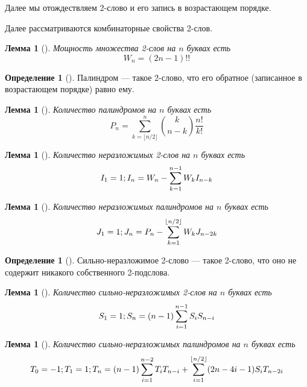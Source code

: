 \documentclass[a4paper,fleqn,12pt,top=0pt]{article}
\theoremstyle{plain}
\newtheorem{lemma}[theorem]{Лемма}
\theoremstyle{definition}
\newtheorem{definition}[theorem]{Определение}
\theoremstyle{remark}
\begin{document}
Далее мы отождествляем 2-слово и его запись в возрастающем порядке.

Далее рассматриваются комбинаторные свойства 2-слов.

\begin{lemma}[]
    Мощность множества 2-слов на $n$ буквах есть 
    \[
    W_n = (2n - 1)!!
    \]
\end{lemma}

\begin{definition}[]
    Палиндром --- такое 2-слово, что его обратное (записанное в возрастающем порядке) равно ему.
\end{definition}

\begin{lemma}[]
    Количество палиндромов на $n$ буквах есть
    \[
    P_n = \sum_{k=\lfloor n/2 \rfloor}^{n} \binom{k}{n - k} \frac{n!}{k!}
    \]
\end{lemma}

\begin{lemma}[]
    Количество неразложимых 2-слов на $n$ буквах есть 
    \[
    I_1 = 1; \\
    I_n = W_n - \sum_{k = 1}^{n - 1}W_kI_{n - k}
    \]
\end{lemma}

\begin{lemma}[]
    Количество неразложимых палиндромов на $n$ буквах есть
    \[
    J_1 = 1; \\ J_n = P_n - \sum_{k = 1}^{\lfloor n / 2 \rfloor}W_kJ_{n - 2k}
    \]
\end{lemma}

\begin{definition}[]
    Сильно-неразложимое 2-слово --- такое 2-слово, что оно не содержит никакого собственного 2-подслова.
\end{definition}

\begin{lemma}[]
    Количество сильно-неразложимых 2-слов на $n$ буквах есть 
    \[
    S_1 = 1; \\
    S_n = (n - 1) \sum_{i = 1}^{n - 1}S_i S_{n - i}
    \]
\end{lemma}

\begin{lemma}[]
    Количество сильно-неразложимых палиндромов на $n$ буквах есть 
    \[
    T_0 = -1; \\
    T_1 = 1; \\
    T_n = (n - 1) \sum_{i = 1}^{n - 2}T_i T_{n - i} + \sum_{i = 1}^{\lfloor n / 2 \rfloor} (2n - 4i - 1)S_i T_{n - 2i}
    \]
\end{lemma}
\end{document}
